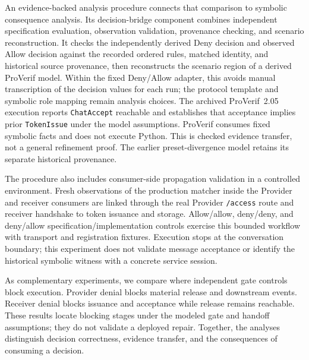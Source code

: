 An evidence-backed analysis procedure connects that comparison to symbolic
consequence analysis. Its decision-bridge component combines independent
specification evaluation, observation validation, provenance checking, and
scenario reconstruction. It checks the independently derived Deny decision
and observed Allow decision against the recorded ordered rules, matched
identity, and historical source provenance, then reconstructs the scenario
region of a derived ProVerif model. Within the fixed Deny/Allow adapter,
this avoids manual transcription of the decision values for each run;
the protocol template and symbolic role mapping remain analysis choices.
The archived ProVerif~2.05 execution reports \texttt{ChatAccept} reachable and
establishes that acceptance implies prior \texttt{TokenIssue} under the model
assumptions. ProVerif consumes fixed symbolic facts and does not execute
Python. This is checked evidence transfer, not a general refinement proof.
The earlier preset-divergence model retains its separate historical provenance.

The procedure also includes consumer-side propagation validation in a
controlled environment. Fresh observations of the production matcher inside
the Provider and receiver consumers are linked through the real Provider
\texttt{/access} route and receiver handshake to token issuance and storage.
Allow/allow, deny/deny, and deny/allow specification/implementation controls
exercise this bounded workflow with transport and registration fixtures.
Execution stops at the conversation boundary; this experiment does not
validate message acceptance or identify the historical symbolic witness
with a concrete service session.

As complementary experiments, we compare where independent gate controls block execution.
Provider denial blocks material release and downstream events. Receiver denial blocks
issuance and acceptance while release remains reachable. These results locate
blocking stages under the modeled gate and handoff assumptions; they do not
validate a deployed repair. Together, the analyses distinguish decision
correctness, evidence transfer, and the consequences of consuming a decision.

